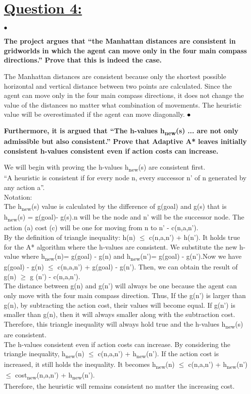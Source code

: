 \documentclass{article}
\begin{document}
\section{\underline{Question 4:}}
$\bullet$ {\large \textbf{The project argues that “the Manhattan distances are consistent in gridworlds in which the agent can move only in the four main compass directions.” Prove that this is indeed the case.}\\\par}
{\large The Manhattan distances are consistent because only the shortest possible horizontal and vertical distance between two points are calculated. Since the agent can move only in the four main compass directions, it does not change the value of the distances no matter what combination of movements. The heuristic value will be overestimated if the agent can move diagonally.}
\newpage
$\\\bullet$ {\large \textbf{Furthermore, it is argued that “The h-values h\textsubscript{new}(s) ... are not only admissible but also consistent.” Prove that Adaptive A* leaves initially consistent h-values consistent even if action costs can increase.}\\\par}
{\large We will begin with proving the h-values h\textsubscript{new}(s) are consistent first.\\“A heuristic is consistent if for every node n, every successor n' of n generated by any action a”.\\Notation:\\The h\textsubscript{new}(s) value is calculated by the difference of g(goal) and g(s) that is \\h\textsubscript{new}(s) = g(goal)- g(s).n will be the node and n’ will be the successor node.
The action (a) cost (c) will be one for moving from n to n’ - c(n,a,n’).\\ By the definition of triangle inequality: h(n) $\leq$ c(n,a,n’) + h(n’). It holds true for the A* algorithm where the h-values are consistent.
We substitute the new h-value where h\textsubscript{new}(n)= g(goal) - g(n) and h\textsubscript{new}(n’)= g(goal) - g(n’).Now we have g(goal) - g(n)  $\leq$ c(n,a,n’) + g(goal) - g(n’).
Then, we can obtain the result of g(n)  $\geq$ g (n’) - c(n,a,n’).
\\The distance between g(n) and g(n’) will always be one because the agent can only move with the four main compass direction. Thus, If the g(n’) is larger than g(n), by subtracting the action cost, their values will become equal. If g(n’) is smaller than g(n), then it will always smaller along with the subtraction cost. Therefore, this triangle inequality will always hold true and the h-values h\textsubscript{new}(s) are consistent. \\The h-values consistent even if action costs can increase.
By considering the triangle inequality, h\textsubscript{new}(n)  $\leq$ c(n,a,n’) + h\textsubscript{new}(n’).
If the action cost is increased, it still holds the inequality. It becomes h\textsubscript{new}(n)  $\leq$ c(n,a,n’) + h\textsubscript{new}(n’)  $\leq$ cost\textsubscript{new}(n,a,n’) + h\textsubscript{new}(n’).\\Therefore, the heuristic will remains consistent no matter the increasing cost.}\\
\end{document}
